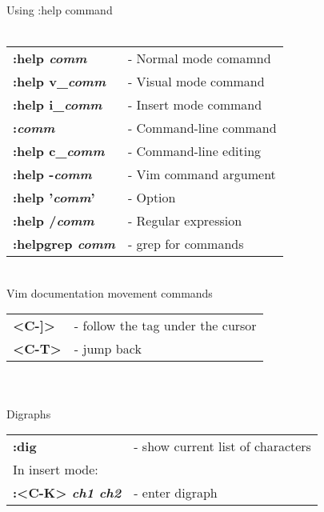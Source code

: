 \documentclass[a4paper,8pt]{extarticle}
\begin{document}
    \newcommand{\ts}[1]{\textsl{#1}}
    \newcommand{\tb}[1]{\textbf{#1}}
    \begin{multicols*}{3}

        \noindent
        {\LARGE Using :help command}\\\\
        \begin{tabular}{ l l }
            \tb{:help \ts{comm}}                &    - Normal mode comamnd                                  \\
            \tb{:help v\_\ts{comm}}             &    - Visual mode command                                  \\
            \tb{:help i\_\ts{comm}}             &    - Insert mode command                                  \\
            \tb{:\ts{comm}}                     &    - Command-line command                                 \\
            \tb{:help c\_\ts{comm}}             &    - Command-line editing                                 \\
            \tb{:help -\ts{comm}}               &    - Vim command argument                                 \\
            \tb{:help '\ts{comm}'}              &    - Option                                               \\
            \tb{:help /\ts{comm}}               &    - Regular expression                                   \\
            \tb{:helpgrep \ts{comm}}            &    - grep for commands                                    \\
        \end{tabular}\\

        \noindent
        Vim documentation movement commands\\
        \begin{tabular}{ l l }
            \tb{<C-]>}                          &    - follow the tag under the cursor                      \\
            \tb{<C-T>}                          &    - jump back                                            \\
        \end{tabular}\\\\

        \noindent
        {\LARGE Digraphs}\\
        \begin{tabular}{ l l }
           \tb{:dig}                            &    - show current list  of characters                     \\
           \multicolumn{2}{l}{In insert mode:}                                                              \\
           \tb{:<C-K> \ts{ch1 ch2}}             &    - enter digraph                                        \\
        \end{tabular}\\\\


\end{multicols*}
\end{document}
